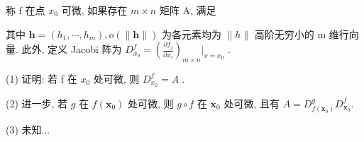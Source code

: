 \par{}
称 f 在点  $x_{0}$  可微, 如果存在  $m \times n$  矩阵 A, 满足\par
\nopagebreak[4]
其中  $\boldsymbol{h}=(h_{1},\cdots,h_{m}),o(\|\boldsymbol{h}\|)$  为各元素均为  $\|h\|$  高阶无穷小的 m 维行向量. 此外, 定义 Jacobi 阵为  $D_{x_{0}}^{f}=\left(\frac{\partial f_{j}}{\partial x_{i}}\right)_{m\times n}\bigg|_{x=x_{0}}$ .\par
(1) 证明: 若 f 在  $x_{0}$  处可微, 则  $D_{x_{0}}^{f}=A$ .\par
(2) 进一步, 若 $g$ 在 $f(\pmb{x}_0)$ 处可微, 则 $g \circ f$ 在 $\pmb{x}_0$ 处可微, 且有 $A = D_{f(\pmb{x}_0)}^g D_{\pmb{x}_0}^f$.\par
(3) 未知...\par

